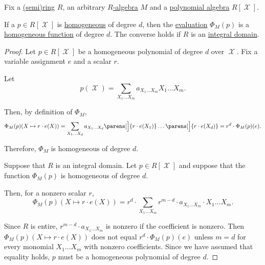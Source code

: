 \begin{proposition}\label{thm:homogeneous_polynomial_iff_homogeneous_function}
  Fix a \hyperref[def:semiring]{(semi)ring} \( R \), an arbitrary \hyperref[def:algebra_over_semiring]{\( R \)-algebra} \( M \) and a \hyperref[def:polynomial_algebra]{polynomial algebra} \( R[\mscrX] \).

  If a \( p \in R[\mscrX] \) is \hyperref[def:homogeneous_polynomial]{homogeneous} of degree \( d \), then the \hyperref[con:evaluation_homomorphism]{evaluation} \( \Phi_M(p) \) is a \hyperref[def:real_homogeneous_function]{homogeneous function} of degree \( d \). The converse holds if \( R \) is an \hyperref[def:integral_domain]{integral domain}.
\end{proposition}
\begin{proof}
  \SufficiencySubProof Let \( p \in R[\mscrX] \) be a homogeneous polynomial of degree \( d \) over \( \mscrX \). Fix a variable assignment \( e \) and a scalar \( r \).

  Let
  \begin{equation*}
    p(\mscrX) = \sum_{X_1 \ldots X_m} a_{X_1 \ldots X_m} X_1 \ldots X_m.
  \end{equation*}

  Then, by definition of \( \Phi_M \),
  \begin{equation*}
    \Phi_M(p)(X \mapsto r \cdot e(X))
    =
    \sum_{X_1 \ldots X_d} a_{X_1 \ldots X_d} \parens[\Big]{ r \cdot e(X_1) } \ldots \parens[\Big]{ r \cdot e(X_d) }
    =
    r^d \cdot \Phi_M(p)(e).
  \end{equation*}

  Therefore, \( \Phi_M \) is homogeneous of degree \( d \).

  \NecessitySubProof Suppose that \( R \) is an integral domain. Let \( p \in R[\mscrX] \) and suppose that the function \( \Phi_M(p) \) is homogeneous of degree \( d \).

  Then, for a nonzero scalar \( r \),
  \begin{equation*}
    \Phi_M(p)(X \mapsto r \cdot e(X))
    =
    r^d \cdot \sum_{X_1 \ldots X_m} r^{m - d} \cdot a_{X_1 \ldots X_m} \cdot X_1 \ldots X_m.
  \end{equation*}

  Since \( R \) is entire, \( r^{m - d} \cdot a_{X_1 \ldots X_m} \) is nonzero if the coefficient is nonzero. Then \( \Phi_M(p)(X \mapsto r \cdot e(X)) \) does not equal \( r^d \cdot \Phi_M(p)(e) \) unless \( m = d \) for every monomial \( X_1 \ldots X_m \) with nonzero coefficients. Since we have assumed that equality holds, \( p \) must be a homogeneous polynomial of degree \( d \).
\end{proof}

